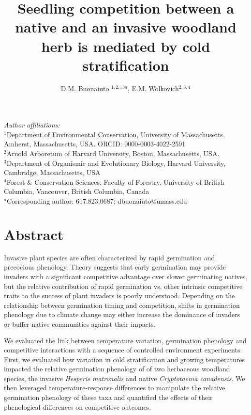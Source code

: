 \documentclass{article}[11pt]
\title{Seedling competition between a native %
and an invasive %
woodland herb is mediated by cold stratification}
\author{D.M. Buonaiuto $^{1,2,,3a}$, E.M. Wolkovich$^{2,3,4}$}
\date{}
\begin{document}

\maketitle
\noindent \emph{Author affiliations:}\\
\noindent $^1$Department of Environmental Conservation, University of Massachusetts, Amherst, Massachusetts, USA. ORCID: 0000-0003-4022-2591\\
\noindent $^2$Arnold Arboretum of Harvard University, Boston, Massachusetts, USA.\\
$^3$Department of Organismic and Evolutionary Biology, Harvard University, Cambridge, Massachusetts, USA \\
$^4$Forest \& Conservation Sciences, Faculty of Forestry, University of British Columbia, Vancouver, British Columbia, Canada\\
$^a$Corresponding author: 617.823.0687; dbuonaiuto@umass.edu\\

\pagebreak
\section*{Abstract}
Invasive plant species are often characterized by rapid germination and precocious phenology. Theory suggests that early germination may provide invaders with a significant competitive advantage over slower germinating natives, but the relative contribution of rapid germination vs. other intrinsic competitive traits to the success of plant invaders is poorly understood. Depending on the relationship between germination timing and competition, shifts in germination phenology due to climate change may either increase the dominance of invaders or buffer native communities against their impacts. %

We evaluated the link between temperature variation, germination phenology and competitive interactions with a sequence of controlled environment experiments. First, we evaluated how variation in cold stratification and growing temperatures impacted the relative germination phenology of of two herbaceous woodland species, the invasive \textit{Hesperis matronalis} and native \textit{Cryptotaenia canadensis}. We then leveraged temperature-response differences to manipulate the relative germination phenology of these taxa and quantified the effects of their phenological differences on competitive outcomes.
\end{document}
